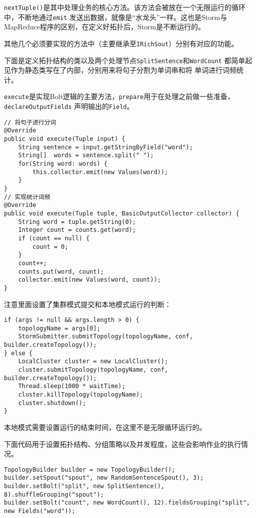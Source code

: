 \lstinline{nextTuple()}是其中处理业务的核心方法。该方法会被放在一个无限运行的循环中，不断地通过\lstinline{emit}
发送出数据，就像是“水龙头”一样。这也是Storm与MapReduce程序的区别，在定义好拓扑后，Storm是不断运行的。

其他几个必须要实现的方法中（主要继承至\lstinline{IRichSout}）分别有对应的功能。

下面是定义拓扑结构的类以及两个处理节点\lstinline{SplitSentence}和\lstinline{WordCount}
都简单起见作为静态类写在了内部，分别用来将句子分割为单词串和将
单词进行词频统计。




\lstinline{execute}是实现Bolt逻辑的主要方法，\lstinline{prepare}用于在处理之前做一些准备，\lstinline{declareOutputFields}
声明输出的\lstinline{Field}。

\begin{lstlisting}[style=customjava]
// 将句子进行分词
@Override
public void execute(Tuple input) {
	String sentence = input.getStringByField("word");
	String[]  words = sentence.split(" ");
	for(String word: words) {
		this.collector.emit(new Values(word));
	}
}
// 实现统计词频
@Override
public void execute(Tuple tuple, BasicOutputCollector collector) {
	String word = tuple.getString(0);
	Integer count = counts.get(word);
	if (count == null) {
		count = 0;
	}
	count++;
	counts.put(word, count);
	collector.emit(new Values(word, count));
}
\end{lstlisting}

注意里面设置了集群模式提交和本地模式运行的判断：

\begin{lstlisting}[style=customjava]
if (args != null && args.length > 0) {
	topologyName = args[0];
	StormSubmitter.submitTopology(topologyName, conf, builder.createTopology());
} else {
	LocalCluster cluster = new LocalCluster();
	cluster.submitTopology(topologyName, conf, builder.createTopology());
	Thread.sleep(1000 * waitTime);
	cluster.killTopology(topologyName);
	cluster.shutdown();
}	
\end{lstlisting}

本地模式需要设置运行的结束时间，在这里不是无限循环运行的。

下面代码用于设置拓扑结构、分组策略以及并发程度，这些会影响作业的执行情况。
\begin{lstlisting}[style=customjava]
TopologyBuilder builder = new TopologyBuilder();
builder.setSpout("spout", new RandomSentenceSpout(), 3);
builder.setBolt("split", new SplitSentence(), 8).shuffleGrouping("spout");
builder.setBolt("count", new WordCount(), 12).fieldsGrouping("split", new Fields("word"));
\end{lstlisting}

